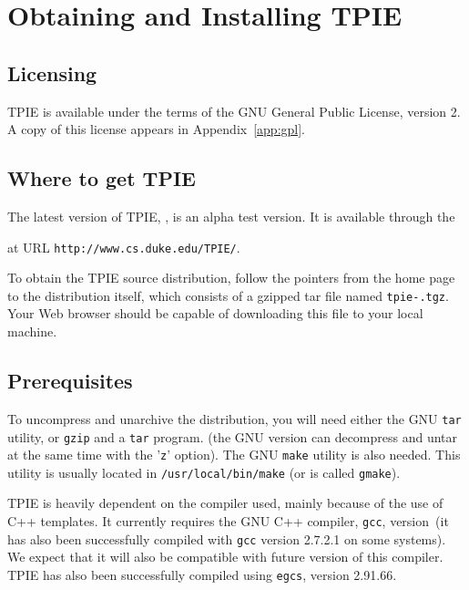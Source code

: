 \chapter{Obtaining and Installing TPIE}

\section{Licensing}

TPIE is available under the terms of the GNU General Public License,
 version 2.  A copy of this license appears in
Appendix~\ref{app:gpl}.

\section{Where to get TPIE}

The latest version of TPIE, \version, is an alpha test version.  It is
available through the %
\begin{latexonly}
at URL \verb|http://www.cs.duke.edu/TPIE/|.
\end{latexonly}
To obtain the TPIE source distribution, follow
the pointers from the home page to the distribution itself, which consists
of a gzipped tar file named {\tt tpie-\version.tgz}. Your Web browser
should be capable of downloading this file to your local machine.


\section{Prerequisites}
\label{sec:gnu-software}

To uncompress and unarchive the distribution, you will need either the GNU
\verb|tar| utility, or \verb|gzip| and a \verb|tar| program. (the GNU
version can decompress and untar at the same time with the '\verb|z|'
option). The GNU \verb|make| utility is also needed. This utility is
usually located in \verb|/usr/local/bin/make| (or is called
\verb|gmake|).

TPIE is heavily dependent on the compiler used, mainly because of the use
of C++ templates. It currently requires the GNU C++ compiler, \verb|gcc|,
version~\gxxversion (it has also been successfully compiled with \verb|gcc|
version 2.7.2.1 on some systems). We expect that it will also be compatible
with future version of this compiler. TPIE has also been successfully
compiled using \verb|egcs|, version 2.91.66.

